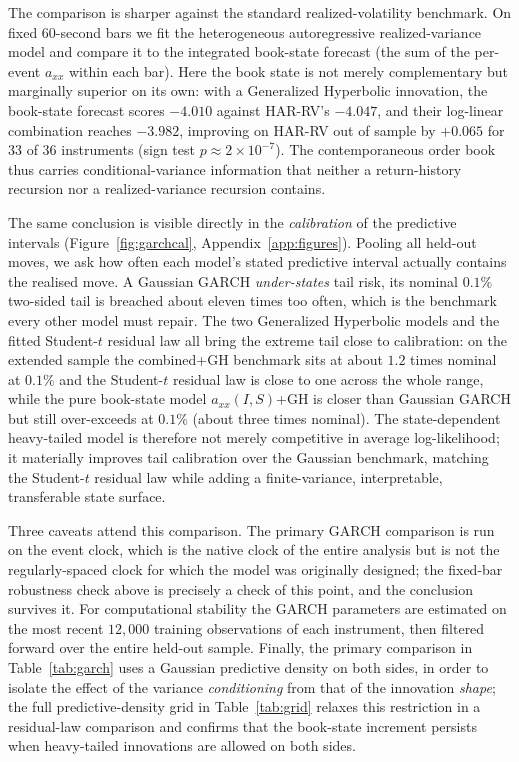 \documentclass[11pt]{article}
\theoremstyle{plain}
\theoremstyle{definition}
\newcommand{\axx}{a_{xx}}
\begin{document}
The comparison is sharper against the standard realized-volatility benchmark. On fixed
$60$-second bars we fit the heterogeneous autoregressive realized-variance model
\citep[HAR-RV,][]{andersen2003} and compare it to the integrated book-state forecast (the sum
of the per-event $\axx$ within each bar). Here the book state is not merely complementary but
marginally superior on its own: with a Generalized Hyperbolic innovation, the book-state
forecast scores $-4.010$ against HAR-RV's $-4.047$, and their log-linear combination reaches
$-3.982$, improving on HAR-RV out of sample by $+0.065$ for $33$ of $36$ instruments (sign
test $p\approx2\times10^{-7}$). The contemporaneous order book thus carries
conditional-variance information that neither a return-history recursion nor a
realized-variance recursion contains.

The same conclusion is visible directly in the \emph{calibration} of the predictive
intervals (Figure~\ref{fig:garchcal}, Appendix~\ref{app:figures}).
Pooling all held-out moves, we ask how often each model's stated predictive interval
actually contains the realised move. A Gaussian GARCH \emph{under-states} tail risk, its
nominal $0.1\%$ two-sided tail is breached about eleven times too often, which is the
benchmark every other model must repair. The two Generalized Hyperbolic models and the
fitted Student-$t$ residual law all bring the extreme tail close to calibration: on the
extended sample the combined+GH benchmark sits at about $1.2$ times nominal at $0.1\%$ and
the Student-$t$ residual law is close to one across the whole range, while the pure
book-state model $a_{xx}(I,S)$+GH is closer than Gaussian GARCH but still over-exceeds at
$0.1\%$ (about three times nominal). The state-dependent heavy-tailed
model is therefore not merely competitive in average log-likelihood; it materially
improves tail calibration over the Gaussian benchmark, matching the Student-$t$ residual law
while adding a finite-variance, interpretable, transferable state surface.

Three caveats attend this comparison. The primary GARCH comparison is run on the event
clock, which is the native clock of the entire analysis but is not the regularly-spaced
clock for which the model was originally designed; the fixed-bar robustness check above
is precisely a check of this point, and the conclusion survives it. For computational
stability the GARCH
parameters are estimated on the most recent $12{,}000$ training observations of each
instrument, then filtered forward over the entire held-out sample. Finally, the primary
comparison in Table~\ref{tab:garch} uses a Gaussian predictive density on both sides, in
order to isolate the effect of the variance \emph{conditioning} from that of the
innovation \emph{shape}; the full predictive-density grid in Table~\ref{tab:grid} relaxes
this restriction in a residual-law comparison and confirms that the book-state increment
persists when heavy-tailed innovations are allowed on both sides.
\end{document}
